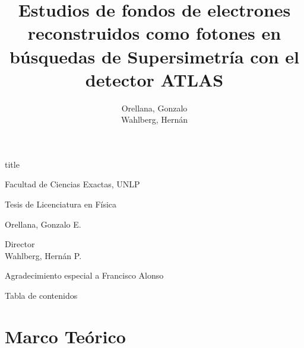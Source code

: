 \documentclass[10pt, compress,spanish]{beamer}
\title[Tesis de Licenciatura]
{Estudios de fondos de electrones reconstruidos como fotones en búsquedas de Supersimetría con el detector ATLAS}
\author{Orellana, Gonzalo \\
		Wahlberg, Hern\'an 
		}
\date{ }
\institute{UNLP}
\begin{document}


\begin{frame}

\addtocounter{framenumber}{-1}

\hrulefill
\vspace{0.5cm}

  \begin{beamercolorbox}[leftskip=\titlelf]{title}
    \centering{}\inserttitle
  \end{beamercolorbox}


\hrulefill


\centering\footnotesize Facultad de Ciencias Exactas, UNLP

Tesis de Licenciatura en Física


\vspace{1cm}
\centering \normalsize Orellana, Gonzalo E.



\vspace{0.5cm}
\small Director\\
\normalsize Wahlberg, Hernán P.

\vspace{1cm}
\footnotesize Agradecimiento especial a Francisco Alonso \\

\end{frame}



\begin{frame}{Tabla de contenidos}
\normalsize
\tableofcontents
\end{frame}

\section{Marco Teórico}
\end{document}

